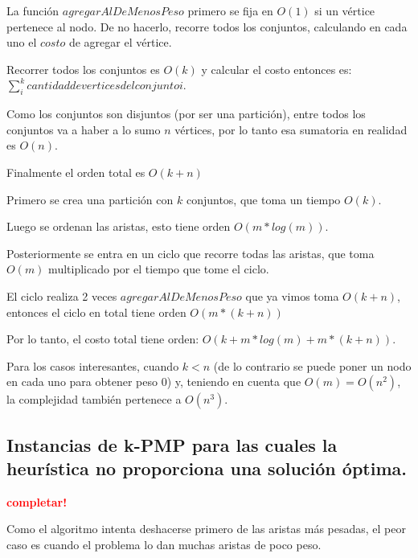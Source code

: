 \vspace*{0.3cm}

La función $agregarAlDeMenosPeso$ primero se fija en $O(1)$ si un vértice
pertenece al nodo. De no hacerlo, recorre todos los conjuntos, calculando en
cada uno el $costo$ de agregar el vértice.

Recorrer todos los conjuntos es $O(k)$ y calcular el costo entonces es:
$\sum_{i}^{k} cantidad de vertices del conjunto i$.

Como los conjuntos son disjuntos (por ser una partición), entre todos los
conjuntos va a haber a lo sumo $n$ vértices, por lo tanto esa sumatoria en
realidad es $O(n)$.

Finalmente el orden total es $O(k + n)$

\vspace*{0.3cm}


Primero se crea una partición con $k$ conjuntos, que toma un tiempo $O(k)$.

Luego se ordenan las aristas, esto tiene orden $O(m * log(m))$.

Posteriormente se entra en un ciclo que recorre todas las aristas, que toma
$O(m)$ multiplicado por el tiempo que tome el ciclo.

El ciclo realiza 2 veces $agregarAlDeMenosPeso$ que ya vimos toma $O(k + n)$,
entonces el ciclo en total tiene orden $O(m * (k + n))$

Por lo tanto, el costo total tiene orden: $O(k + m * log(m) + m * (k + n))$.

Para los casos interesantes, cuando $k < n$ (de lo contrario se puede poner un
nodo en cada uno para obtener peso 0) y, teniendo en cuenta que $O(m) = O(n^2)$,
la complejidad también pertenece a $O(n^3)$.

\newpage
\subsection{Instancias de k-PMP para las cuales la heurística no proporciona
            una solución óptima.}
\vspace*{0.3cm}
\textcolor{red}{\textbf{completar!}}

Como el algoritmo intenta deshacerse primero de las aristas más pesadas, el
peor caso es cuando el problema lo dan muchas aristas de poco peso.

